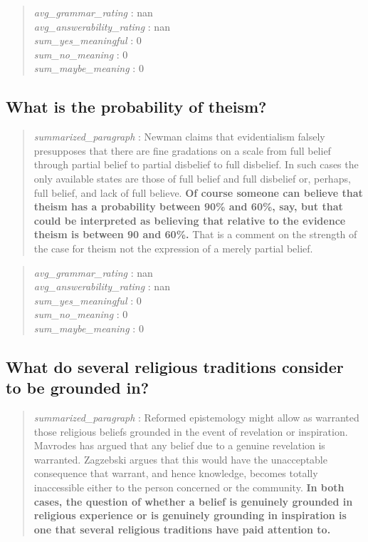 \begin{quote}
\emph{avg\_grammar\_rating} : nan\\
\emph{avg\_answerability\_rating} : nan\\
\emph{sum\_yes\_meaningful} : 0\\
\emph{sum\_no\_meaning} : 0\\
\emph{sum\_maybe\_meaning} : 0
\end{quote}

\hypertarget{what-is-the-probability-of-theism}{%
\subsection{What is the probability of
theism?}\label{what-is-the-probability-of-theism}}

\begin{quote}
\emph{summarized\_paragraph} : Newman claims that evidentialism falsely
presupposes that there are fine gradations on a scale from full belief
through partial belief to partial disbelief to full disbelief. In such
cases the only available states are those of full belief and full
disbelief or, perhaps, full belief, and lack of full believe. \textbf{Of
course someone can believe that theism has a probability between 90\%
and 60\%, say, but that could be interpreted as believing that relative
to the evidence theism is between 90 and 60\%.} That is a comment on the
strength of the case for theism not the expression of a merely partial
belief.
\end{quote}

\begin{quote}
\emph{avg\_grammar\_rating} : nan\\
\emph{avg\_answerability\_rating} : nan\\
\emph{sum\_yes\_meaningful} : 0\\
\emph{sum\_no\_meaning} : 0\\
\emph{sum\_maybe\_meaning} : 0
\end{quote}

\hypertarget{what-do-several-religious-traditions-consider-to-be-grounded-in}{%
\subsection{What do several religious traditions consider to be grounded
in?}\label{what-do-several-religious-traditions-consider-to-be-grounded-in}}

\begin{quote}
\emph{summarized\_paragraph} : Reformed epistemology might allow as
warranted those religious beliefs grounded in the event of revelation or
inspiration. Mavrodes has argued that any belief due to a genuine
revelation is warranted. Zagzebski argues that this would have the
unacceptable consequence that warrant, and hence knowledge, becomes
totally inaccessible either to the person concerned or the community.
\textbf{In both cases, the question of whether a belief is genuinely
grounded in religious experience or is genuinely grounding in
inspiration is one that several religious traditions have paid attention
to.}
\end{quote}

